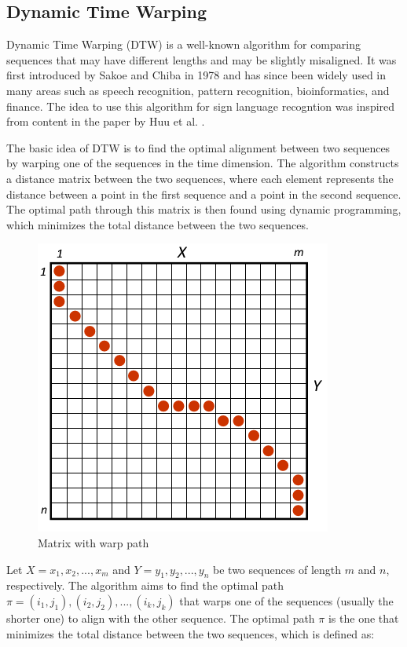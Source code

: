 \documentclass[final,rdr32.tex]{subfiles}
\begin{document}
\subsection{Dynamic Time Warping}

Dynamic Time Warping (DTW) is a well-known algorithm for comparing sequences that may have different lengths and may be slightly misaligned. It was first introduced by Sakoe and Chiba in 1978 \cite{sakoe1978dynamic} and has since been widely used in many areas such as speech recognition, pattern recognition, bioinformatics, and finance. The idea to use this algorithm for sign language recogntion was inspired from content in the paper by Huu et al. \cite{huu2014human}.

The basic idea of DTW is to find the optimal alignment between two sequences by warping one of the sequences in the time dimension. The algorithm constructs a distance matrix between the two sequences, where each element represents the distance between a point in the first sequence and a point in the second sequence. The optimal path through this matrix is then found using dynamic programming, which minimizes the total distance between the two sequences.

\begin{figure}
    \begin{center}
        \includegraphics[scale=0.8]{images/DTW.png}
        \caption[caption]{Matrix with warp path}
    \end{center}
\end{figure}


Let $X = {x_1, x_2, ..., x_{m}}$ and $Y = {y_1, y_2, ..., y_{n}}$ be two sequences of length $m$ and $n$, respectively. The algorithm aims to find the optimal path $\pi = {(i_1,j_1),(i_2,j_2),...,(i_k,j_k)}$ that warps one of the sequences (usually the shorter one) to align with the other sequence. The optimal path $\pi$ is the one that minimizes the total distance between the two sequences, which is defined as:
\end{document}
